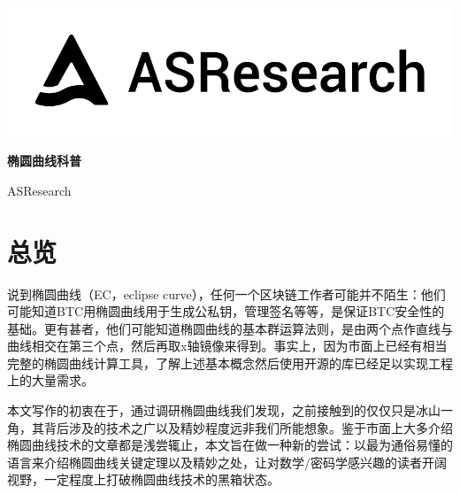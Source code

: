 \documentclass[12pt]{article}
\begin{document}
\pagestyle{empty}
\renewcommand{\contentsname}{目录}
\renewcommand{\abstractname}{摘要}
\renewcommand{\refname}{参考文献}
\renewcommand{\figurename}{图}
\renewcommand{\tablename}{表}
\renewcommand{\baselinestretch}{1.5}
\renewcommand{\appendixname}{附录}
\renewcommand{\proofname}{证明}

\pagecolor{\pcolor}



\begin{titlepage}
  \begin{center}
    \vspace*{5.5cm}
    \includegraphics[scale=0.5]{../common/logo.png}
    \vspace{0.5cm}


   \textbf{\huge{椭圆曲线科普}}

    \vspace{0.5cm}
    ASResearch
    \textbf{}
  \end{center}

\end{titlepage}
\setcounter{page}{0}
\tableofcontents
\newpage
\setcounter{page}{1}
\pagestyle{fancy}
\vspace*{0.01cm}

\section{总览}
说到椭圆曲线（EC，eclipse curve），任何一个区块链工作者可能并不陌生：他们可能知道BTC用椭圆曲线用于生成公私钥，管理签名等等，是保证BTC安全性的基础。更有甚者，他们可能知道椭圆曲线的基本群运算法则，是由两个点作直线与曲线相交在第三个点，然后再取x轴镜像来得到。事实上，因为市面上已经有相当完整的椭圆曲线计算工具，了解上述基本概念然后使用开源的库已经足以实现工程上的大量需求。

本文写作的初衷在于，通过调研椭圆曲线我们发现，之前接触到的仅仅只是冰山一角，其背后涉及的技术之广以及精妙程度远非我们所能想象。鉴于市面上大多介绍椭圆曲线技术的文章都是浅尝辄止，本文旨在做一种新的尝试：以最为通俗易懂的语言来介绍椭圆曲线关键定理以及精妙之处，让对数学/密码学感兴趣的读者开阔视野，一定程度上打破椭圆曲线技术的黑箱状态。
\end{document}
